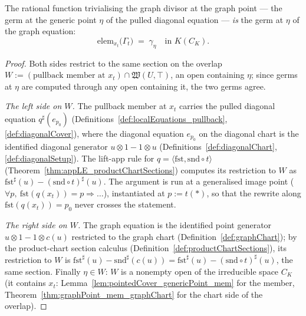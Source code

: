 \begin{theorem}
  \label{thm:presentationElem_graphLocalEquations_val}
  \leanok
  The rational function trivialising the graph divisor at the graph point — the germ at the
  generic point \(\eta\) of the pulled diagonal equation — \emph{is} the germ at \(\eta\)
  of the graph equation:
  \[
    \mathrm{elem}_{x_t}\bigl(\Gamma_t\bigr)
      \;=\; \gamma_\eta \quad\text{in } K(C_K).
  \]
\end{theorem}
\begin{proof}
  \leanok
  Both sides restrict to the same section on the overlap
  \(W := (\text{pullback member at } x_t) \cap \mathfrak W(U, \top)\), an open containing
  \(\eta\); since germs at \(\eta\) are computed through any open containing it, the two
  germs agree.

  \emph{The left side on \(W\).} The pullback member at \(x_t\) carries the pulled
  diagonal equation \(q^{\sharp}(e_{p_0})\) (Definitions~\ref{def:localEquations_pullback},
  \ref{def:diagonalCover}), where the diagonal equation \(e_{p_0}\) on the diagonal chart
  is the identified diagonal generator \(u \otimes 1 - 1 \otimes u\)
  (Definitions~\ref{def:diagonalChart}, \ref{def:diagonalSetup}). The lift-app rule for
  \(q = \langle\mathrm{fst}, \mathrm{snd}\circ t\rangle\)
  (Theorem~\ref{thm:appLE_productChartSections}) computes its restriction to \(W\) as
  \(\mathrm{fst}^{\sharp}(u) - (\mathrm{snd}\circ t)^{\sharp}(u)\). The argument is run at
  a generalised image point (\(\forall p,\ \mathrm{fst}(q(x_t)) = p \Rightarrow \dots\)),
  instantiated at \(p := t(\ast)\), so that the rewrite along
  \(\mathrm{fst}(q(x_t)) = p_0\) never crosses the statement.

  \emph{The right side on \(W\).} The graph equation is the identified point generator
  \(u \otimes 1 - 1 \otimes c(u)\) restricted to the graph chart
  (Definition~\ref{def:graphChart}); by the product-chart section calculus
  (Definition~\ref{def:productChartSections}), its restriction to \(W\) is
  \(\mathrm{fst}^{\sharp}(u) - \mathrm{snd}^{\sharp}(c(u))
    = \mathrm{fst}^{\sharp}(u) - (\mathrm{snd} \circ t)^{\sharp}(u)\),
  the same section. Finally \(\eta \in W\): \(W\) is a nonempty open of the irreducible
  space \(C_K\) (it contains \(x_t\):
  Lemma~\ref{lem:pointedCover_genericPoint_mem} for the member,
  Theorem~\ref{thm:graphPoint_mem_graphChart} for the chart side of the overlap).
\end{proof}

